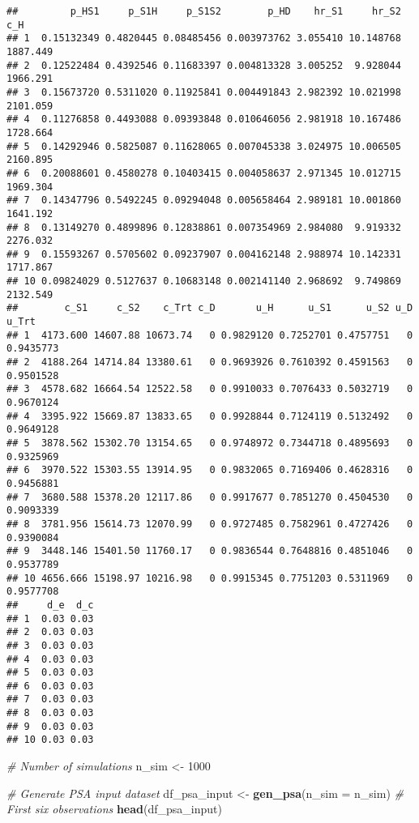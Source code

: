\documentclass[
]{article}
\newenvironment{Shaded}{\begin{snugshade}}{\end{snugshade}}
\newcommand{\CommentTok}[1]{\textcolor[rgb]{0.56,0.35,0.01}{\textit{#1}}}
\newcommand{\DataTypeTok}[1]{\textcolor[rgb]{0.13,0.29,0.53}{#1}}
\newcommand{\DecValTok}[1]{\textcolor[rgb]{0.00,0.00,0.81}{#1}}
\newcommand{\KeywordTok}[1]{\textcolor[rgb]{0.13,0.29,0.53}{\textbf{#1}}}
\newcommand{\NormalTok}[1]{#1}
\newcommand{\StringTok}[1]{\textcolor[rgb]{0.31,0.60,0.02}{#1}}
\begin{document}
\begin{verbatim}
##         p_HS1     p_S1H     p_S1S2        p_HD    hr_S1     hr_S2      c_H
## 1  0.15132349 0.4820445 0.08485456 0.003973762 3.055410 10.148768 1887.449
## 2  0.12522484 0.4392546 0.11683397 0.004813328 3.005252  9.928044 1966.291
## 3  0.15673720 0.5311020 0.11925841 0.004491843 2.982392 10.021998 2101.059
## 4  0.11276858 0.4493088 0.09393848 0.010646056 2.981918 10.167486 1728.664
## 5  0.14292946 0.5825087 0.11628065 0.007045338 3.024975 10.006505 2160.895
## 6  0.20088601 0.4580278 0.10403415 0.004058637 2.971345 10.012715 1969.304
## 7  0.14347796 0.5492245 0.09294048 0.005658464 2.989181 10.001860 1641.192
## 8  0.13149270 0.4899896 0.12838861 0.007354969 2.984080  9.919332 2276.032
## 9  0.15593267 0.5705602 0.09237907 0.004162148 2.988974 10.142331 1717.867
## 10 0.09824029 0.5127637 0.10683148 0.002141140 2.968692  9.749869 2132.549
##        c_S1     c_S2    c_Trt c_D       u_H      u_S1      u_S2 u_D     u_Trt
## 1  4173.600 14607.88 10673.74   0 0.9829120 0.7252701 0.4757751   0 0.9435773
## 2  4188.264 14714.84 13380.61   0 0.9693926 0.7610392 0.4591563   0 0.9501528
## 3  4578.682 16664.54 12522.58   0 0.9910033 0.7076433 0.5032719   0 0.9670124
## 4  3395.922 15669.87 13833.65   0 0.9928844 0.7124119 0.5132492   0 0.9649128
## 5  3878.562 15302.70 13154.65   0 0.9748972 0.7344718 0.4895693   0 0.9325969
## 6  3970.522 15303.55 13914.95   0 0.9832065 0.7169406 0.4628316   0 0.9456881
## 7  3680.588 15378.20 12117.86   0 0.9917677 0.7851270 0.4504530   0 0.9093339
## 8  3781.956 15614.73 12070.99   0 0.9727485 0.7582961 0.4727426   0 0.9390084
## 9  3448.146 15401.50 11760.17   0 0.9836544 0.7648816 0.4851046   0 0.9537789
## 10 4656.666 15198.97 10216.98   0 0.9915345 0.7751203 0.5311969   0 0.9577708
##     d_e  d_c
## 1  0.03 0.03
## 2  0.03 0.03
## 3  0.03 0.03
## 4  0.03 0.03
## 5  0.03 0.03
## 6  0.03 0.03
## 7  0.03 0.03
## 8  0.03 0.03
## 9  0.03 0.03
## 10 0.03 0.03
\end{verbatim}

\begin{Shaded}
\begin{Highlighting}[]
\CommentTok{# Number of simulations}
\NormalTok{n_sim <-}\StringTok{ }\DecValTok{1000}

\CommentTok{# Generate PSA input dataset}
\NormalTok{df_psa_input <-}\StringTok{ }\KeywordTok{gen_psa}\NormalTok{(}\DataTypeTok{n_sim =}\NormalTok{ n_sim)}
\CommentTok{# First six observations}
\KeywordTok{head}\NormalTok{(df_psa_input)}
\end{Highlighting}
\end{Shaded}
\end{document}
